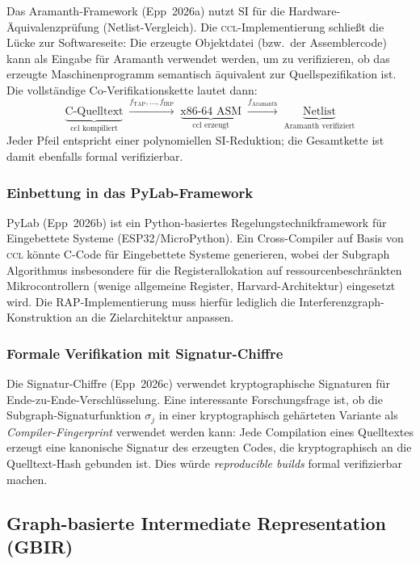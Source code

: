 ﻿\documentclass[a4paper,12pt]{article}
\theoremstyle{definition}
\begin{document}
Das Aramanth-Framework (Epp~2026a) nutzt SI für die
Hardware-Äquivalenzprüfung (Netlist-Vergleich). Die
\textsc{ccl}-Implementierung schließt die Lücke zur Softwareseite: Die
erzeugte Objektdatei (bzw.\ der Assemblercode) kann als Eingabe für
Aramanth verwendet werden, um zu verifizieren, ob das erzeugte
Maschinenprogramm semantisch äquivalent zur Quellspezifikation ist.
Die vollständige Co-Verifikationskette lautet dann:
\[
\underbrace{\text{C-Quelltext}}_{\text{ccl kompiliert}}
\;\xrightarrow{f_{\mathrm{TAP}}, \ldots, f_{\mathrm{IRP}}}\;
\underbrace{\text{x86-64 ASM}}_{\text{ccl erzeugt}}
\;\xrightarrow{f_{\mathrm{Aramanth}}}\;
\underbrace{\text{Netlist}}_{\text{Aramanth verifiziert}}
\]
Jeder Pfeil entspricht einer polynomiellen SI-Reduktion; die
Gesamtkette ist damit ebenfalls formal verifizierbar.

\subsubsection{Einbettung in das PyLab-Framework}

PyLab (Epp~2026b) ist ein Python-basiertes Regelungstechnikframework
für Eingebettete Systeme (ESP32/MicroPython). Ein
Cross-Compiler auf Basis von \textsc{ccl} könnte C-Code für
Eingebettete Systeme generieren, wobei der Subgraph Algorithmus
insbesondere für die Registerallokation auf ressourcenbeschränkten
Mikrocontrollern (wenige allgemeine Register, Harvard-Architektur)
eingesetzt wird. Die RAP-Implementierung muss hierfür lediglich die
Interferenzgraph-Konstruktion an die Zielarchitektur anpassen.

\subsubsection{Formale Verifikation mit Signatur-Chiffre}

Die Signatur-Chiffre (Epp~2026c) verwendet kryptographische Signaturen
für Ende-zu-Ende-Verschlüsselung. Eine interessante Forschungsfrage
ist, ob die Subgraph-Signaturfunktion $\sigma_j$ in einer
kryptographisch gehärteten Variante als \emph{Compiler-Fingerprint}
verwendet werden kann: Jede Compilation eines Quelltextes erzeugt
eine kanonische Signatur des erzeugten Codes, die kryptographisch
an die Quelltext-Hash gebunden ist. Dies würde
\emph{reproducible builds} formal verifizierbar machen.

\subsection{Graph-basierte Intermediate Representation (GBIR)}
\label{sec:ausblick-gbir}
\end{document}
